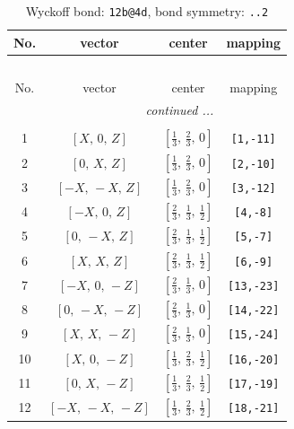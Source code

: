 \documentclass[fleqn,8pt]{jsarticle}
\begin{document}
\renewcommand{\arraystretch}{1.2}
\begin{longtable}{cccc}
\caption{Wyckoff bond: {\tt 12b@4d}, bond symmetry: {\tt ..2}}
 \\
 \hline \hline
No. & vector & center & mapping \\ \hline \endfirsthead

\multicolumn{3}{l}{\tablename\ \thetable{}} \\
 \hline \hline
No. & vector & center & mapping \\ \hline \endhead

 \hline \hline
\multicolumn{3}{r}{\footnotesize\it continued ...} \\ \endfoot

 \hline \hline
\multicolumn{3}{r}{} \\ \endlastfoot

1 & $\left[ X,\, 0,\, Z \right]$ & $\left[ \frac{1}{3},\, \frac{2}{3},\, 0 \right]$ & {\tt [1,-11]} \\ \hline
2 & $\left[ 0,\, X,\, Z \right]$ & $\left[ \frac{1}{3},\, \frac{2}{3},\, 0 \right]$ & {\tt [2,-10]} \\ \hline
3 & $\left[ - X,\, - X,\, Z \right]$ & $\left[ \frac{1}{3},\, \frac{2}{3},\, 0 \right]$ & {\tt [3,-12]} \\ \hline
4 & $\left[ - X,\, 0,\, Z \right]$ & $\left[ \frac{2}{3},\, \frac{1}{3},\, \frac{1}{2} \right]$ & {\tt [4,-8]} \\ \hline
5 & $\left[ 0,\, - X,\, Z \right]$ & $\left[ \frac{2}{3},\, \frac{1}{3},\, \frac{1}{2} \right]$ & {\tt [5,-7]} \\ \hline
6 & $\left[ X,\, X,\, Z \right]$ & $\left[ \frac{2}{3},\, \frac{1}{3},\, \frac{1}{2} \right]$ & {\tt [6,-9]} \\ \hline
7 & $\left[ - X,\, 0,\, - Z \right]$ & $\left[ \frac{2}{3},\, \frac{1}{3},\, 0 \right]$ & {\tt [13,-23]} \\ \hline
8 & $\left[ 0,\, - X,\, - Z \right]$ & $\left[ \frac{2}{3},\, \frac{1}{3},\, 0 \right]$ & {\tt [14,-22]} \\ \hline
9 & $\left[ X,\, X,\, - Z \right]$ & $\left[ \frac{2}{3},\, \frac{1}{3},\, 0 \right]$ & {\tt [15,-24]} \\ \hline
10 & $\left[ X,\, 0,\, - Z \right]$ & $\left[ \frac{1}{3},\, \frac{2}{3},\, \frac{1}{2} \right]$ & {\tt [16,-20]} \\ \hline
11 & $\left[ 0,\, X,\, - Z \right]$ & $\left[ \frac{1}{3},\, \frac{2}{3},\, \frac{1}{2} \right]$ & {\tt [17,-19]} \\ \hline
12 & $\left[ - X,\, - X,\, - Z \right]$ & $\left[ \frac{1}{3},\, \frac{2}{3},\, \frac{1}{2} \right]$ & {\tt [18,-21]} \\
\end{longtable}
\end{document}

